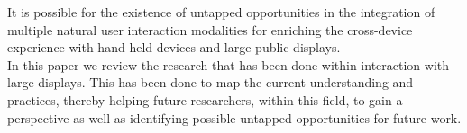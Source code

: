 It is possible for the existence of untapped opportunities in the integration of multiple natural user interaction modalities for enriching the cross-device experience with hand-held devices and large public displays. \\

In this paper we review the research that has been done within interaction with large displays. 
This has been done to map the current understanding and practices, thereby helping future researchers, within this field, to gain a perspective as well as identifying possible untapped opportunities for future work.